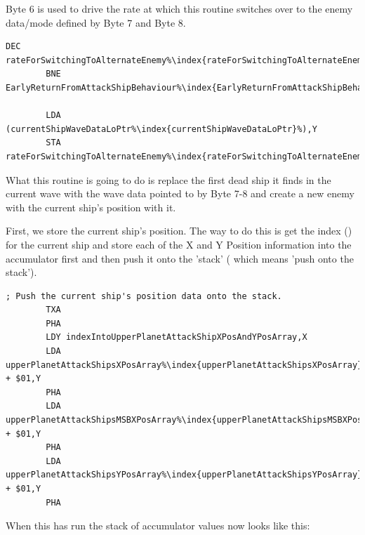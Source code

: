 Byte 6 is used to drive the rate at which this routine switches over to the enemy data/mode defined by Byte 7 and Byte 8.

\begin{lstlisting}[caption=\icode{rateForSwitchingToAlternateEnemy\index{rateForSwitchingToAlternateEnemy}} (Byte 6) is decremented and reloaded each time it reaches zero. ,escapechar=\%]
        DEC rateForSwitchingToAlternateEnemy%\index{rateForSwitchingToAlternateEnemy}%,X
        BNE EarlyReturnFromAttackShipBehaviour%\index{EarlyReturnFromAttackShipBehaviour}%

        LDA (currentShipWaveDataLoPtr%\index{currentShipWaveDataLoPtr}%),Y
        STA rateForSwitchingToAlternateEnemy%\index{rateForSwitchingToAlternateEnemy}%,X
\end{lstlisting}

What this routine is going to do is replace the first dead ship it finds in the current wave with the wave data pointed to by  Byte 7-8
and create a new enemy with the current ship's position with it.

First, we store the current ship's position. The way to do this is get the index () for the current ship  and store
each of the X and Y Position information into the accumulator first  and then push it onto the 'stack' ( which means
'push  onto the stack').

\begin{lstlisting}[escapechar=\%]
        ; Push the current ship's position data onto the stack.
        TXA
        PHA
        LDY indexIntoUpperPlanetAttackShipXPosAndYPosArray,X
        LDA upperPlanetAttackShipsXPosArray%\index{upperPlanetAttackShipsXPosArray}% + $01,Y
        PHA
        LDA upperPlanetAttackShipsMSBXPosArray%\index{upperPlanetAttackShipsMSBXPosArray}% + $01,Y
        PHA
        LDA upperPlanetAttackShipsYPosArray%\index{upperPlanetAttackShipsYPosArray}% + $01,Y
        PHA
\end{lstlisting}

When this has run the stack of accumulator values now looks like this:

